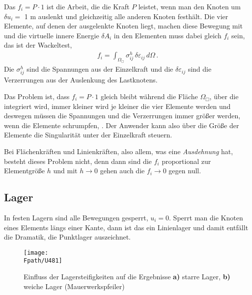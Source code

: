 {Das $f_i = P \cdot 1$ ist die Arbeit, die die Kraft $P$ leistet, wenn man den Knoten um $\delta u_i =$ 1 m auslenkt und gleichzeitig alle anderen Knoten festh\"{a}lt. Die vier Elemente, auf denen der ausgelenkte Knoten liegt, machen diese Bewegung mit und die virtuelle innere Energie $\delta A_i $ in den Elementen muss dabei gleich $f_i $ sein, das ist der \glq Wackeltest\grq,
\begin{align}\label{Eq64}
f_i = \int_{\Omega_\Box} \sigma_{ij}^h\,\delta \varepsilon_{ij}\,d\Omega\,.
\end{align}
Die $\sigma_{ij}^h $ sind die Spannungen aus der Einzelkraft und die $\delta \varepsilon_{ij} $ sind die Verzerrungen aus der Auslenkung des Lastknotens.

Das Problem ist, dass $f_i = P \cdot 1 $ gleich bleibt w\"{a}hrend die Fl\"{a}che $\Omega_\Box$, \"{u}ber die integriert wird, immer kleiner wird je kleiner die vier Elemente werden und deswegen m\"{u}ssen  die Spannungen und die Verzerrungen immer gr\"{o}{\ss}er werden, wenn die Elemente schrumpfen, \cite{HaJa2}. Der Anwender kann also \"{u}ber die Gr\"{o}{\ss}e der Elemente die Singularit\"{a}t unter der Einzelkraft steuern.

Bei Fl\"{a}chenkr\"{a}ften und Linienkr\"{a}ften, also allem, was eine {\em Ausdehnung\/} hat, besteht dieses Problem nicht, denn dann sind die $f_i$ proportional zur Elementgr\"{o}{\ss}e $h$  und mit $h \to 0$ gehen auch die $f_i \to 0$ gegen null.

{\textcolor{sectionTitleBlue}{\section{Lager}}}
\vspace{-0.1cm}
In festen Lagern sind alle Bewegungen gesperrt, $u_i = 0$. Sperrt man die Knoten eines Elements l\"{a}ngs einer Kante, dann ist das ein Linienlager und damit entf\"{a}llt die Dramatik, die Punktlager auszeichnet.
\begin{figure}[tbp] \centering
\if {} \sidecaption \fi
\texttt{[image: \\Fpath/U481]}
\caption{Einfluss der Lagersteifigkeiten auf die Ergebnisse {\bf a)} starre Lager, {\bf
b)} weiche Lager
(Mauerwerkspfeiler)} \label{DLT}
\end{figure}%

}
